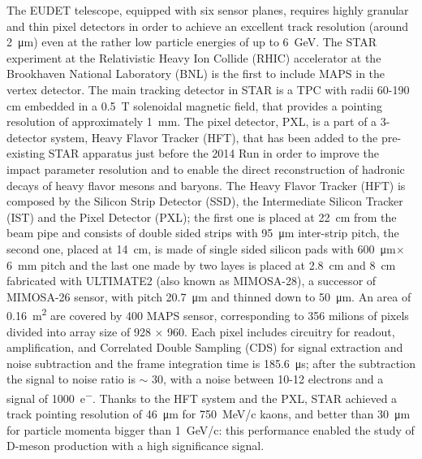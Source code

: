         The EUDET telescope, equipped with six sensor planes, requires highly granular and thin pixel detectors in order to achieve an excellent track resolution (around \SI{2}{\um}) even at the rather low particle energies of up to \SI{6}{GeV}.
        The STAR experiment at the Relativistic Heavy Ion Collide (RHIC) accelerator at the Brookhaven National Laboratory (BNL) is the first to include MAPS in the vertex detector\cite{STAR}.
        The main tracking detector in STAR is a TPC with radii 60-190 cm  embedded in a \SI{0.5}{T} solenoidal magnetic field, that provides a pointing resolution of approximately \SI{1}{mm}. 
        The pixel detector, PXL, is a part of a 3-detector system, Heavy Flavor Tracker (HFT), that has been added to the pre-existing STAR apparatus just before the 2014 Run in order to improve the impact parameter resolution and to enable the direct reconstruction of hadronic decays of heavy flavor mesons and baryons.     
        The Heavy Flavor Tracker (HFT) is composed by the Silicon Strip Detector (SSD), the Intermediate Silicon Tracker (IST) and the Pixel Detector (PXL); the first one is placed at \SI{22}{cm} from the beam pipe and consists of double sided strips with \SI{95}{\um} inter-strip pitch, the second one, placed at \SI{14}{cm}, is made of single sided silicon pads with \SI{600}{\um}$\times$\SI{6}{mm} pitch and the last one made by two layes is placed at \SI{2.8}{cm} and \SI{8}{cm} fabricated with ULTIMATE2 (also known as MIMOSA-28), a successor of MIMOSA-26 sensor, with pitch \SI{20.7}{\um} and thinned down to \SI{50}{\um}.
        An area of \SI{0.16}{m\squared} are covered by 400 MAPS sensor, corresponding to 356 milions of pixels divided into array size of 928 $\times$ 960.
        Each pixel includes circuitry for readout, amplification, and Correlated Double Sampling (CDS) for signal extraction and noise subtraction and the frame integration time is \SI{185.6}{\us}; after the subtraction the signal to noise ratio is $\sim$ 30, with a noise between 10-12 electrons and a signal of \SI{1000}{e^-}.
        Thanks to the HFT system and the PXL, STAR achieved a track pointing resolution of \SI{46}{\um} for \SI{750}{MeV/c} kaons, and better than \SI{30}{\um} for particle momenta bigger than \SI{1}{GeV/c}: this performance enabled the study of D-meson production with a high significance signal.


